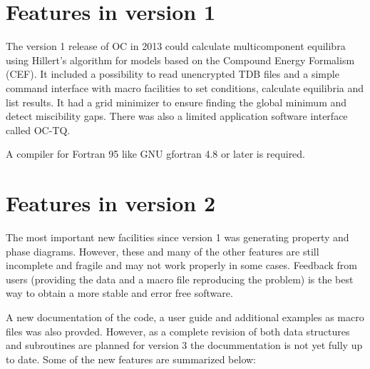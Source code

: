 \documentclass[12pt]{article}
\begin{document}
\section{Features in version 1}

The version 1 release of OC in 2013 could calculate multicomponent
equilibra using Hillert's algorithm\cite{81Hil} for models based on
the Compound Energy Formalism (CEF)\cite{01Hil,07Luk}. It included a
possibility to read unencrypted TDB files and a simple command
interface with macro facilities to set conditions, calculate
equilibria and list results.  It had a grid minimizer to ensure
finding the global minimum and detect miscibility gaps.  There was
also a limited application software interface called OC-TQ.

A compiler for Fortran 95 like GNU gfortran 4.8 or later is required.

\section{Features in version 2}

The most important new facilities since version 1 was generating
property and phase diagrams.  However, these and many of the other
features are still incomplete and fragile and may not work properly in
some cases.  Feedback from users (providing the data and a macro file
reproducing the problem) is the best way to obtain a more stable and
error free software.

A new documentation of the code, a user guide and additional examples
as macro files was also provded.  However, as a complete revision of
both data structures and subroutines are planned for version 3 the
docummentation is not yet fully up to date.  Some of the new features
are summarized below:
\end{document}
